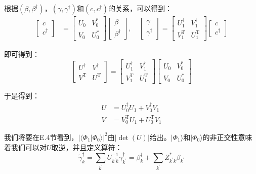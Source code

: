 \begin{booknote*}
根据$(\beta,\beta^{\dagger})$，$(\gamma,\gamma^{\dagger})$和$(c,c^{\dagger})$的关系，可以得到：
\begin{align*}
\begin{bmatrix}c\\
c^{\dagger}
\end{bmatrix} & =\begin{bmatrix}U_{0} & V^{*}_{0}\\
V_{0} & U^{*}_{0}
\end{bmatrix}\begin{bmatrix}\beta\\
\beta^{\dagger}
\end{bmatrix},\quad\begin{bmatrix}\gamma\\
\gamma^{\dagger}
\end{bmatrix}=\begin{bmatrix}U^{\dagger}_{1} & V^{\dagger}_{1}\\
V^{\mathrm{T}}_{1} & U^{\mathrm{T}}_{1}
\end{bmatrix}\begin{bmatrix}c\\
c^{\dagger}
\end{bmatrix}
\end{align*}

即可得到：
\[
\begin{bmatrix}U^{\dagger} & V^{\dagger}\\
V^{\mathrm{T}} & U^{\mathrm{T}}
\end{bmatrix}=\begin{bmatrix}U^{\dagger}_{1} & V^{\dagger}_{1}\\
V^{\mathrm{T}}_{1} & U^{\mathrm{T}}_{1}
\end{bmatrix}\begin{bmatrix}U_{0} & V^{*}_{0}\\
V_{0} & U^{*}_{0}
\end{bmatrix}
\]

于是得到：
\begin{align*}
U & =U^{\dagger}_{0}U_{1}+V^{\dagger}_{0}V_{1}\\
V & =V^{\mathrm{T}}_{0}U_{1}+U^{\mathrm{T}}_{0}V_{1}
\end{align*}
\end{booknote*}
我们将要在E.4节看到，$\left|\langle\Phi_{1}|\Phi_{0}\rangle\right|^{2}$由$\left|\det(U)\right|$给出。$|\Phi_{1}\rangle$和$|\Phi_{0}\rangle$的非正交性意味着我们可以对$U$取逆，并且定义算符：
\begin{equation}
\tilde{\gamma}^{\dagger}_{k}=\sum_{k^{\prime}}U^{-1}_{k^{\prime}k}\gamma^{\dagger}_{k^{\prime}}=\beta^{\dagger}_{k}+\sum_{k^{\prime}}Z^{*}_{k^{\prime}k}\beta_{k^{\prime}}\label{eq:normalization of gamma}
\end{equation}

